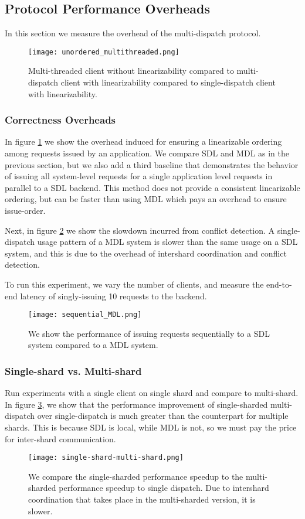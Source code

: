 \subsection{Protocol Performance Overheads}
In this section we measure the overhead of the multi-dispatch protocol.
\begin{figure}[!htb]
\texttt{[image: unordered\_multithreaded.png]}
\caption{Multi-threaded client without linearizability compared to multi-dispatch client with linearizability compared to single-dispatch client with linearizability.}
\label{fig:unordered-mt}
\end{figure}
\subsubsection{Correctness Overheads}
In figure \ref{fig:unordered-mt} we show the overhead induced for ensuring a linearizable ordering among requests issued by an application. We compare SDL and MDL as in the previous section, but we also add a third baseline that demonstrates the behavior of issuing all system-level requests for a single application level requests in parallel to a SDL backend. This method does not provide a consistent linearizable ordering, but can be faster than using MDL which pays an overhead to ensure issue-order.

Next, in figure \ref{fig:sequential-md} we show the slowdown incurred from conflict detection. A single-dispatch usage pattern of a MDL system is slower than the same usage on a SDL system, and this is due to the overhead of intershard coordination and conflict detection.

To run this experiment, we vary the number of clients, and measure the end-to-end latency of singly-issuing 10 requests to the backend.
\begin{figure}[!htb]
\texttt{[image: sequential\_MDL.png]}
\caption{We show the performance of issuing requests sequentially to a SDL system compared to a MDL system.}
\label{fig:sequential-md}
\end{figure}
\subsubsection{Single-shard vs. Multi-shard}
Run experiments with a single client on single shard and compare to multi-shard. In figure \ref{fig:ss-vs-ms}, we show that the performance improvement of single-sharded multi-dispatch over single-dispatch is much greater than the counterpart for multiple shards. This is because SDL is local, while MDL is not, so we must pay the price for inter-shard communication.
\begin{figure}[!htb]
\texttt{[image: single-shard-multi-shard.png]}
\caption{We compare the single-sharded performance speedup to the multi-sharded performance speedup to single dispatch. Due to intershard coordination that takes place in the multi-sharded version, it is slower.}
\label{fig:ss-vs-ms}
\end{figure}

